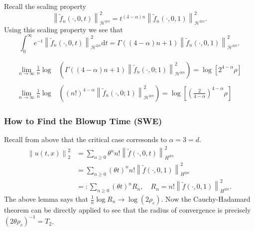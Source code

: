 \documentclass{beamer}%
\numberwithin{equation}{section}
\newcommand{\Norm}[1]{\left\|  #1   \right\|}
\newcommand{\ud}{\ensuremath{\mathrm{d} }}
\begin{document}
	\begin{frame}
		
		
		Recall the scaling property
		\[
		\Norm{\tilde{f}_n(\cdot,0,t)}_{\mathcal{H}^{\otimes n}}^2 = t^{(4-\alpha)n}\Norm{\tilde{f}_n(\cdot,0,1)}_{\mathcal{H}^{\otimes n}}^2.
		\]
		Using this scaling property we see that
		\[
		\int_0^\infty e^{-t}\Norm{\tilde{f}_n(\cdot,0,t)}_{\mathcal{H}^{\otimes n}}^2  \ud t = \Gamma((4-\alpha)n+1)\Norm{\tilde{f}_n(\cdot,0,1)}_{\mathcal{H}^{\otimes n}}^2.
		\]
		
		\begin{lemma}
			
			\begin{align*}
			\lim_{n \to \infty}\frac{1}{n} \log & \left(\Gamma((4-\alpha)n+1)\Norm{\tilde{f}_n(\cdot,0;1)}_{\mathcal{H}^{\otimes n}}^2\right) = \log\left[ 2^{4-\alpha}\rho \right]
			\\ \\ \lim_{n \to \infty}\frac{1}{n} \log & \left((n!)^{4-\alpha}\Norm{\tilde{f}_n(\cdot,0;1)}_{\mathcal{H}^{\otimes n}}^2\right) = \log\left[ \left(\frac{2}{4-\alpha}\right)^{4-\alpha}\rho \right]
			\end{align*}
		\end{lemma}
	\end{frame}
	
	\begin{frame}[t]
		\frametitle{How to Find the Blowup Time (SWE)}
		Recall from above that the critical case corresonds to $\alpha = 3 = d$.
		\begin{align*}
		\Norm{u(t,x)}_2^2 &= \sum_{n \ge 0} \theta^n n! \Norm{\tilde{f}(\cdot,0,t)}_{H^{\otimes n}}^2
		\\&= \sum_{n \ge 0} (\theta t)^n n! \Norm{\tilde{f}(\cdot,0,1)}_{H^{\otimes n}}^2
		\\& =: \sum_{n \ge 0} (\theta t)^n R_n, \quad R_n = n! \Norm{\tilde{f}(\cdot,0,1)}_{H^{\otimes n}}^2.
		\end{align*}
		The above lemma says that $\frac{1}{n}\log{R_n} \to \log(2 \rho_c)$. Now the Cauchy-Hadamard theorem can be directly applied to see that the radius of convergence is precisely $(2\theta \rho_c)^{-1} = T_2$.
		
	\end{frame}
	
\end{document}
